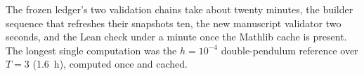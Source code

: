 The frozen ledger's two validation chains take about twenty minutes, the builder sequence that
refreshes their snapshots ten, the new manuscript validator two seconds, and the Lean check under a
minute once the Mathlib cache is present. The longest single computation was the $h=10^{-4}$
double-pendulum reference over $T=3$ (1.6~h), computed once and cached.
